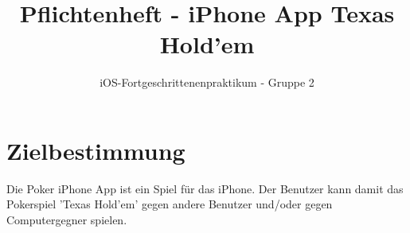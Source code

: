 \documentclass[a4paper,12pt,bibtotoc, parskip=full]{article}
\begin{document}
\begin{titlepage}
\title{Pflichtenheft - iPhone App Texas Hold'em}
\author{iOS-Fortgeschrittenenpraktikum - Gruppe 2}
\maketitle
\vspace{10cm}
\thispagestyle{empty}
\end{titlepage}
\newpage
\thispagestyle{empty}
\tableofcontents
\newpage
\setcounter{page}{1}

\section{Zielbestimmung}
Die Poker iPhone App ist ein Spiel für das iPhone. Der Benutzer kann damit das Pokerspiel 'Texas Hold'em' gegen andere Benutzer und/oder gegen Computergegner spielen.
\end{document}
